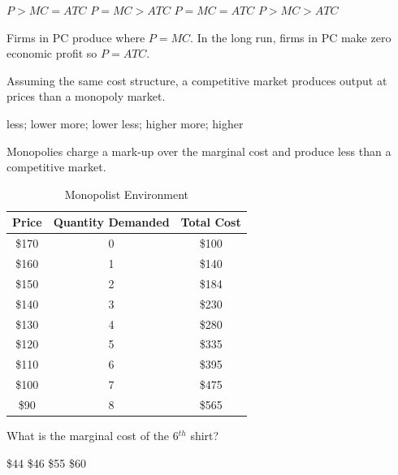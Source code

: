 \documentclass[addpoints,11pt]{exam}
\theoremstyle{definition}
\newcommand{\blank}[0]{\underline{\hspace{3cm}}}
\begin{document}
\begin{questions}
	\begin{choices}
		\choice $P > MC = ATC$
		\choice $P = MC > ATC$ 
		\CorrectChoice $P = MC = ATC$
		\choice $P > MC > ATC$
	\end{choices}
	
	\begin{solution}
		Firms in PC produce where $P = MC$. In the long run, firms in PC make zero economic profit so $P=ATC$.
	\end{solution}
			

			\question Assuming the same cost structure, a competitive market produces \blank output at \blank prices than a monopoly market.
			
			\begin{choices}
				\choice less; lower
				\CorrectChoice more; lower
				\choice less; higher
				\choice more; higher
			\end{choices}
			
			\begin{solution}
				Monopolies charge a mark-up over the marginal cost and produce less than a competitive market.
			\end{solution}

\newpage

		

		\begin{table}[h!]
			\caption{Monopolist Environment}
			\label{tab3}
			\centering
			\begin{tabular}{  c|c|c}    
				Price & Quantity Demanded & Total Cost \\    
				\hline
				\$170 & 0 & \$100 \\
				\$160 & 1 & \$140 \\
				\$150 & 2 & \$184 \\
				\$140 & 3 & \$230 \\
				\$130 & 4 & \$280 \\
				\$120 & 5 & \$335 \\
				\$110 & 6 & \$395 \\
				\$100 & 7 & \$475 \\ 
				\$90 & 8 & \$565 \\
			\end{tabular}
		\end{table}

			
			\question \label{blah3} What is the marginal cost of the 6$^{th}$ shirt?
			
			\begin{choices}
				\choice \$44
				\choice  \$46
				\choice  \$55
				\CorrectChoice \$60
			\end{choices}
			

\end{questions}
\end{document}
